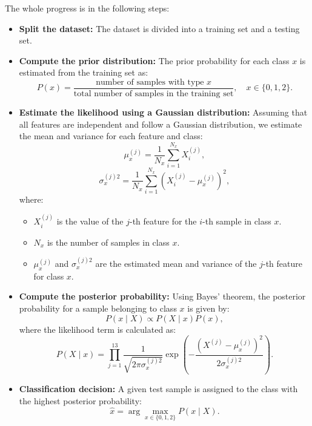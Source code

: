 The whole progress is in the following steps:
    \begin{itemize}
        \item \textbf{Split the dataset:}  
        The dataset is divided into a training set and a testing set.

        \item \textbf{Compute the prior distribution:}  
        The prior probability for each class \( x \) is estimated from the training set as:
        \begin{equation*}
            P(x) = \frac{\text{number of samples with type } x}{\text{total number of samples in the training set}}, \quad x \in \{0,1,2\}.
        \end{equation*}

        \item \textbf{Estimate the likelihood using a Gaussian distribution:}  
        Assuming that all features are independent and follow a Gaussian distribution, we estimate the mean and variance for each feature and class:
        \begin{equation*}
            \mu_{x}^{(j)} = \frac{1}{N_x} \sum_{i=1}^{N_x} X_i^{(j)},
        \end{equation*}
        \begin{equation*}
            \sigma_{x}^{(j)2} = \frac{1}{N_x} \sum_{i=1}^{N_x} \left( X_i^{(j)} - \mu_{x}^{(j)} \right)^2,
        \end{equation*}
        where:
        \begin{itemize}
            \item \( X_i^{(j)} \) is the value of the \( j \)-th feature for the \( i \)-th sample in class \( x \).
            \item \( N_x \) is the number of samples in class \( x \).
            \item \( \mu_{x}^{(j)} \) and \( \sigma_{x}^{(j)2} \) are the estimated mean and variance of the \( j \)-th feature for class \( x \).
        \end{itemize}

        \item \textbf{Compute the posterior probability:}  
        Using Bayes' theorem, the posterior probability for a sample belonging to class \( x \) is given by:
        \begin{equation*}
            P(x \mid X) \propto P(X \mid x) P(x),
        \end{equation*}
        where the likelihood term is calculated as:
        \begin{equation*}
            P(X \mid x) = \prod_{j=1}^{13} \frac{1}{\sqrt{2\pi\sigma_{x}^{(j)2}}} \exp\left( -\frac{(X^{(j)} - \mu_{x}^{(j)})^2}{2\sigma_{x}^{(j)2}} \right).
        \end{equation*}

        \item \textbf{Classification decision:}  
        A given test sample is assigned to the class with the highest posterior probability:
        \begin{equation*}
            \hat{x} = \arg\max_{x \in \{0,1,2\}} P(x \mid X).
        \end{equation*}

    \end{itemize}